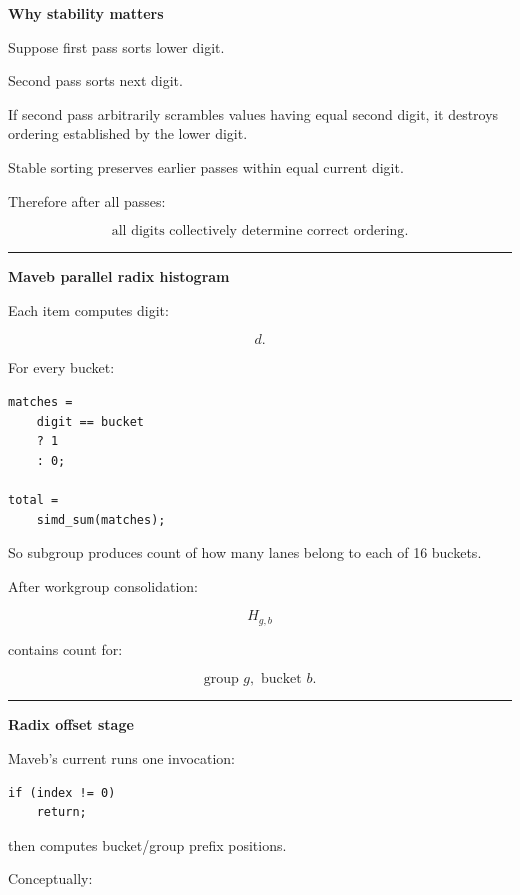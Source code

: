 \textbf{Why stability matters}

Suppose first pass sorts lower digit.

Second pass sorts next digit.

If second pass arbitrarily scrambles values having equal second digit, it destroys ordering established by the lower digit.

Stable sorting preserves earlier passes within equal current digit.

Therefore after all passes:

\[
\boxed{\text{all digits collectively determine correct ordering}.}
\]

\begin{center}\rule{0.5\linewidth}{0.5pt}\end{center}

\textbf{Maveb parallel radix histogram}

Each item computes digit:

\[
d.
\]

For every bucket:

\protect{}\label{45mfzb}%
\begin{verbatim}
matches =
    digit == bucket
    ? 1
    : 0;

total =
    simd_sum(matches);
\end{verbatim}

So subgroup produces count of how many lanes belong to each of 16 buckets.

After workgroup consolidation:

\[
H_{g,b}
\]

contains count for:

\[
\text{group }g,
\text{ bucket }b.
\]

\begin{center}\rule{0.5\linewidth}{0.5pt}\end{center}

\textbf{Radix offset stage}

Maveb's current  runs one invocation:

\protect{}\label{akbc8n}%
\begin{verbatim}
if (index != 0)
    return;
\end{verbatim}

then computes bucket/group prefix positions.

Conceptually:

